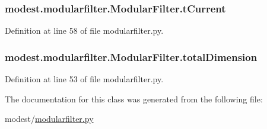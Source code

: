 \subsubsection[{\texorpdfstring{t\+Current}{tCurrent}}]{\setlength{\rightskip}{0pt plus 5cm}modest.\+modularfilter.\+Modular\+Filter.\+t\+Current}\hypertarget{classmodest_1_1modularfilter_1_1ModularFilter_a917f511b39632b804f3ecf667f5a6d96}{}\label{classmodest_1_1modularfilter_1_1ModularFilter_a917f511b39632b804f3ecf667f5a6d96}


Definition at line 58 of file modularfilter.\+py.

\subsubsection[{\texorpdfstring{total\+Dimension}{totalDimension}}]{\setlength{\rightskip}{0pt plus 5cm}modest.\+modularfilter.\+Modular\+Filter.\+total\+Dimension}\hypertarget{classmodest_1_1modularfilter_1_1ModularFilter_ae7028964e7e7adf58d75b76aef9783f6}{}\label{classmodest_1_1modularfilter_1_1ModularFilter_ae7028964e7e7adf58d75b76aef9783f6}


Definition at line 53 of file modularfilter.\+py.



The documentation for this class was generated from the following file\+:\begin{DoxyCompactItemize}
\item 
modest/\hyperlink{modularfilter_8py}{modularfilter.\+py}\end{DoxyCompactItemize}
